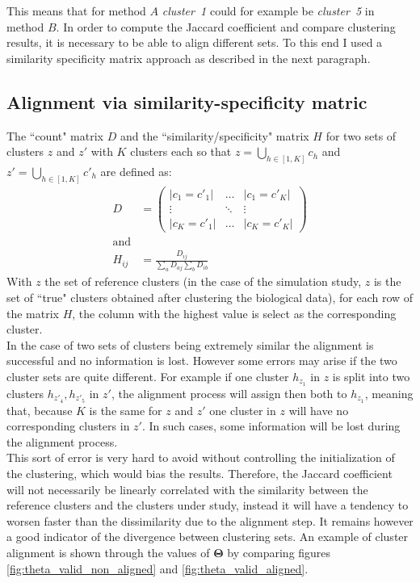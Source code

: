 This means that for method $A$ \emph{cluster~1} could for example be \emph{cluster~5} in method $B$. In order to compute the Jaccard coefficient and compare clustering results, it is necessary to be able to align different sets. To this end I used a similarity specificity matrix approach as described in the next paragraph.


	\subsection{Alignment via similarity-specificity matric}
The ``count" matrix $D$ and the ``similarity/specificity" matrix $H$ for two sets of clusters $z$ and $z'$ with $K$ clusters each so that $z = \bigcup_{h \in [1,K]} c_h $ and $z' = \bigcup_{h \in [1,K]} c'_h$ are defined as:
\begin{align*}
D &= \left( \begin{array} {ccc}
|c_1 = c'_1| & \ldots  & |c_1 = c'_K|\\
\vdots & \ddots & \vdots\\
|c_K = c'_1| & \ldots & |c_K = c'_K| \end{array} \right)\\
\text{and}\\
H_{ij} &= \frac{D_{ij}}{\sum_{a} D_{aj} \sum_{b} D_{ib}} 
\end{align*}
With $z$ the set of reference clusters (in the case of the simulation study, $z$ is the set of ``true" clusters obtained after clustering the biological data), for each row of the matrix $H$, the column with the highest value is select as the corresponding cluster.\\

In the case of two sets of clusters being extremely similar the alignment is successful and no information is lost. However some errors may arise if the two cluster sets are quite different. For example if one cluster $h_{z_1}$ in $z$ is split into two clusters $h_{z'_4},h_{z'_5}$ in $z'$, the alignment process will assign then both to $h_{z_1}$, meaning that, because $K$ is the same for $z$ and $z'$ one cluster in $z$ will have no corresponding clusters in $z'$. In such cases, some information will be lost during the alignment process.\\

This sort of error is very hard to avoid without controlling the initialization of the clustering, which would bias the results. Therefore, the Jaccard coefficient will not necessarily be linearly correlated with the similarity between the reference clusters and the clusters under study, instead it will have a tendency to worsen faster than the dissimilarity due to the alignment step. It remains however a good indicator of the divergence between clustering sets. An example of cluster alignment is shown through the values of $\boldsymbol{\Theta}$ by comparing  figures \ref{fig:theta_valid_non_aligned} and \ref{fig:theta_valid_aligned}.\\

